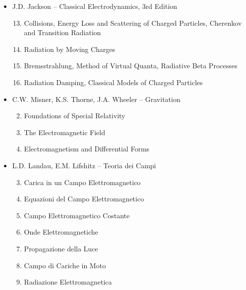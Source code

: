 \begin{itemize}
\item J.D. Jackson -- Classical Electrodynamics, 3rd Edition
\begin{enumerate}
\setcounter{enumi}{12}
\item Collisions, Energy Loss and Scattering of Charged Particles, Cherenkov and Transition Radiation
\item Radiation by Moving Charges
\item Bremsstrahlung, Method of Virtual Quanta, Radiative Beta Processes
\item Radiation Damping, Classical Models of Charged Particles
\end{enumerate}

\item C.W. Misner, K.S. Thorne, J.A. Wheeler -- Gravitation
\begin{enumerate}
\setcounter{enumi}{1}
\item Foundations of Special Relativity
\item The Electromagnetic Field
\item Electromagnetism and Differential Forms
\end{enumerate}

\item L.D. Landau, E.M. Lifshitz -- Teoria dei Campi
\begin{enumerate}
\setcounter{enumi}{2}
\item Carica in un Campo Elettromagnetico
\item Equazioni del Campo Elettromagnetico
\item Campo Elettromagnetico Costante
\item Onde Elettromagnetiche
\item Propagazione della Luce
\item Campo di Cariche in Moto
\item Radiazione Elettromagnetica
\end{enumerate}

\end{itemize}
